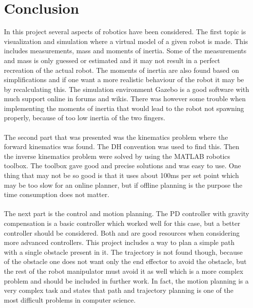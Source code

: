 \chapter{Conclusion}
In this project several aspects of robotics have been considered. The first topic is visualization and simulation where a virtual model of a given robot is made. This includes measurements, mass and moments of inertia. Some of the measurements and mass is only guessed or estimated and it may not result in a perfect recreation of the actual robot. The moments of inertia are also found based on simplifications and if one want a more realistic behaviour of the robot it may be by recalculating this. The simulation environment Gazebo is a good software with much support online in forums and wikis. There was however some trouble when implementing the moments of inertia that would lead to the robot not spawning properly, because of too low inertia of the two fingers.\\\\
The second part that was presented was the kinematics problem where the forward kinematics was found. The DH convention was used to find this. Then the inverse kinematics problem were solved by using the MATLAB robotics toolbox\cite{MatlabRobTool}. The toolbox gave good and precise solutions and was easy to use. One thing that may not be so good is that it uses about 100ms per set point which may be too slow for an online planner\cite{spong}, but if offline planning is the purpose the time consumption does not matter.
\\\\
The next part is the control and motion planning. The PD controller with gravity compensation is a basic controller which worked well for this case, but a better controller should be considered. Both \cite{spong} and \cite{Siciliano} are good resources when considering more advanced controllers. This project includes a way to plan a simple path with a single obstacle present in it. The trajectory is not found though, because of the obstacle one does not want only the end effector to avoid the obstacle, but the rest of the robot manipulator must avoid it as well which is a more complex problem and should be included in further work. In fact, the motion planning is a very complex task and \cite{spong} states that path and trajectory planning is one of the most difficult problems in computer science. 
